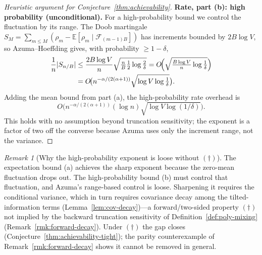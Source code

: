 \documentclass[11pt]{article}
\newcommand{\E}{\mathbb{E}}
\newcommand{\F}{\mathcal{F}}
\theoremstyle{plain}
\theoremstyle{definition}
\theoremstyle{remark}
\newtheorem{remark}[theorem]{Remark}
\begin{document}
\begin{proof}[Heuristic argument for Conjecture~\ref{thm:achievability}]
\textbf{Rate, part (b): high probability (unconditional).}
For a high-probability bound we control the fluctuation by its
range. The Doob martingale $S_M = \sum_{m \leq M}(\rho_m -
\E[\rho_m \mid \F_{(m-1)B}])$ has increments bounded by
$2B\log V$, so Azuma--Hoeffding gives, with probability
$\geq 1-\delta$,
\[
\begin{split}
\frac1n|S_{n/B}|
&\leq \frac{2B\log V}{n}\sqrt{\tfrac{n}{B}\tfrac12\log\tfrac2\delta}
= O\!\Bigl(\sqrt{\tfrac{B\log V}{n}\log\tfrac1\delta}\Bigr)\\
&= O\!\bigl(n^{-\alpha/(2(\alpha+1))}\sqrt{\log V\log\tfrac1\delta}\bigr).
\end{split}
\]
Adding the mean bound from part (a), the high-probability rate
overhead is
\[
O\big(n^{-\alpha/(2(\alpha+1))}(\log n)\sqrt{\log V \log(1/\delta)}\big).
\]
This holds with no assumption beyond truncation
sensitivity; the exponent is a factor of two off the converse
because Azuma uses only the increment range, not the variance.
\end{proof}

\begin{remark}[Why the high-probability exponent is loose without $(\dagger)$]
\label{rmk:ach-distortion}
The expectation bound (a) achieves the sharp exponent because the
zero-mean fluctuation drops out. The high-probability bound (b)
must control that fluctuation, and Azuma's range-based control is
loose. Sharpening it requires the conditional variance, which in
turn requires covariance decay among the tilted-information terms
(Lemma~\ref{lem:cov-decay})---a forward/two-sided property
$(\dagger)$ not implied by the backward truncation sensitivity of
Definition~\ref{def:poly-mixing} (Remark~\ref{rmk:forward-decay}).
Under $(\dagger)$ the gap closes
(Conjecture~\ref{thm:achievability-tight}); the parity counterexample
of Remark~\ref{rmk:forward-decay} shows it cannot be removed in
general.
\end{remark}
\end{document}

